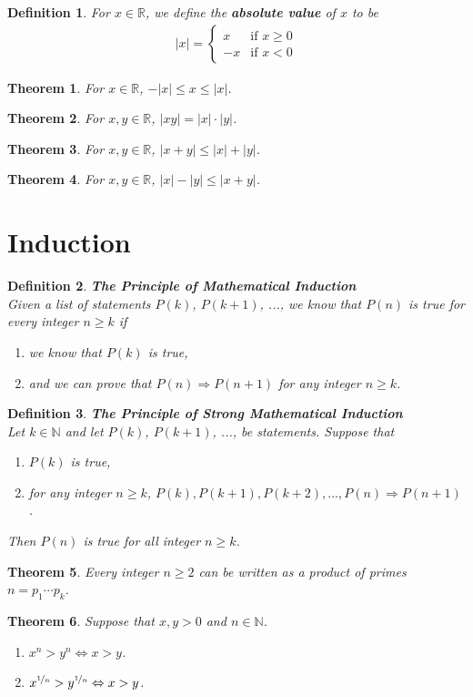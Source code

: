 \documentclass{article}
\theoremstyle{sltheorem}
\newtheorem{definition}{Definition}[section]
\newtheorem{theorem}{Theorem}[section]
\newcommand{\R}{\mathbb{R}}
\newcommand{\N}{\mathbb{N}}
\newcommand*\B[1]{\textbf{#1}}
\begin{document}
\begin{definition}
    For $x\in\R$, we define the \B{absolute value} of $x$ to be
    \begin{align*}
        \vert x \vert = \begin{cases}
            x &\text{if } x \geq 0\\
            -x &\text{if } x < 0
        \end{cases}
    \end{align*}
\end{definition}
\begin{theorem}
    For $x\in\R$, $-|x|\leq x \leq |x|$.
\end{theorem}
\begin{theorem}
    For $x,y\in\R$, $|xy|=|x|\cdot |y|$.
\end{theorem}
\begin{theorem}
    For $x,y\in\R$, $|x+y| \leq |x| + |y|$.
\end{theorem}
\begin{theorem}
    For $x,y\in\R$, $|x|-|y|\leq |x+y|$.
\end{theorem}
\section{Induction}
\begin{definition}
    \B{The Principle of Mathematical Induction}\\
    Given a list of statements $P(k)$, $P(k+1)$, ..., we know that $P(n)$ is true for every integer $n\geq k$ if
    \begin{enumerate}
        \item we know that $P(k)$ is true,
        \item and we can prove that $P(n)\Rightarrow P(n+1)$ for any integer $n\geq k$.
    \end{enumerate}
\end{definition}
\begin{definition}
    \B{The Principle of Strong Mathematical Induction}\\
    Let $k\in\N$ and let $P(k)$, $P(k+1)$, ..., be statements. Suppose that
    \begin{enumerate}
        \item $P(k)$ is true,
        \item for any integer $n\geq k$, $P(k), P(k+1), P(k+2), ..., P(n)\Rightarrow P(n+1)$.
    \end{enumerate}
    Then $P(n)$ is true for all integer $n\geq k$.
\end{definition}
\begin{theorem}
    Every integer $n\geq 2$ can be written as a product of primes $n=p_1\cdots p_k$.
\end{theorem}
\begin{theorem}
    Suppose that $x,y>0$ and $n\in\N$.
    \begin{enumerate}
        \item $x^n>y^n\Leftrightarrow x>y$.
        \item $x^{\nicefrac{1}{n}}>y^{\nicefrac{1}{n}}\Leftrightarrow x>y$.
    \end{enumerate}
\end{theorem}
\end{document}
